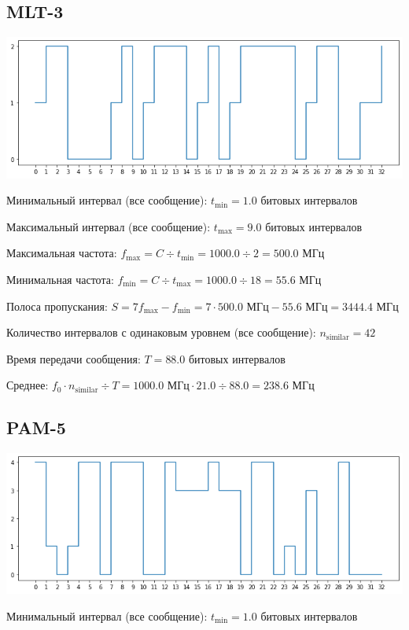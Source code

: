 \subsection{MLT-3}
\includegraphics[width=\textwidth]{1mlt3}

Минимальный интервал (все сообщение): $t_\mathrm{min}=1.0$ битовых интервалов

Максимальный интервал (все сообщение): $t_\mathrm{max}=9.0$ битовых интервалов

Максимальная частота: $f_\mathrm{max}=C\div t_\mathrm{min}=1000.0\div 2=500.0$ МГц

Минимальная частота: $f_\mathrm{min}=C\div t_\mathrm{max}=1000.0\div 18=55.6$ МГц

Полоса пропускания: $S=7f_\mathrm{max}-f_\mathrm{min} = 7\cdot 500.0\text{ МГц}-55.6\text{ МГц}=3444.4$ МГц

Количество интервалов с одинаковым уровнем (все сообщение): $n_\mathrm{similar}=42$

Время передачи сообщения: $T=88.0$ битовых интервалов

Среднее: $f_0\cdot n_\mathrm{similar}\div T=1000.0\text{ МГц}\cdot 21.0\div 88.0=238.6$ МГц

\subsection{PAM-5}
\includegraphics[width=\textwidth]{1pam5}

Минимальный интервал (все сообщение): $t_\mathrm{min}=1.0$ битовых интервалов

